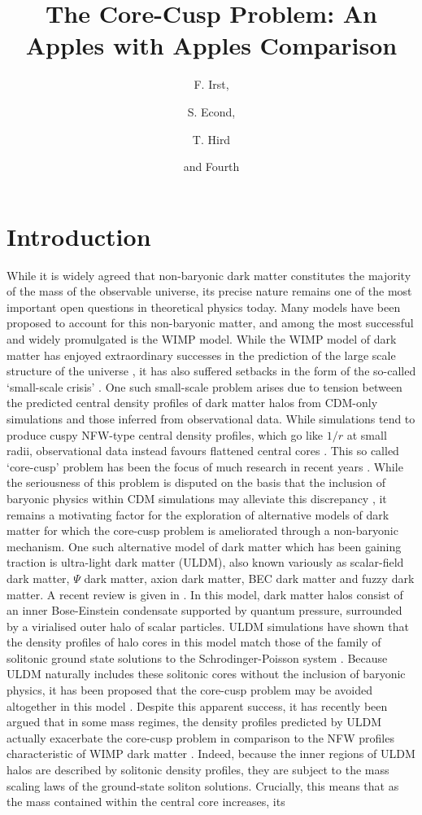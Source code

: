 \documentclass[a4paper,11pt]{article}
\title{\boldmath The Core-Cusp Problem: An Apples with Apples Comparison}
\author[a,b,1]{F. Irst,\note{Corresponding author.}}
\author[c]{S. Econd,}
\author[a,2]{T. Hird\note{Also at Some University.}}
\author[a,2]{and Fourth}
\affiliation[a]{One University,\\some-street, Country}
\affiliation[b]{Another University,\\different-address, Country}
\affiliation[c]{A School for Advanced Studies,\\some-location, Country}
\begin{document}
\maketitle
\flushbottom

\section{Introduction}\label{sec:intro}

While it is widely agreed that non-baryonic dark matter constitutes the majority of the mass of the observable universe, its precise nature remains one of the most important open questions in theoretical physics today. Many models have been proposed to account for this non-baryonic matter, and among the most successful and widely promulgated is the WIMP model. While the WIMP model of dark matter has enjoyed extraordinary successes in the prediction of the large scale structure of the universe \cite{REF}, it has also suffered setbacks in the form of the so-called `small-scale crisis' \cite{https://arxiv.org/abs/1707.04256}. One such small-scale problem arises due to tension between the predicted central density profiles of dark matter halos from CDM-only simulations and those inferred from observational data. While simulations tend to produce cuspy NFW-type central density profiles, which go like $1/r$ at small radii, observational data instead favours flattened central cores \cite{REF} . This so called `core-cusp' problem has been the focus of much research in recent years \cite{Ref}. While the seriousness of this problem is disputed on the basis that the inclusion of baryonic physics within CDM simulations may alleviate this discrepancy \cite{REF}, it remains a motivating factor for the exploration of alternative models of dark matter for which the core-cusp problem is ameliorated through a non-baryonic mechanism. One such alternative model of dark matter which has been gaining traction is ultra-light dark matter (ULDM), also known variously as scalar-field dark matter, $\Psi$ dark matter, axion dark matter, BEC dark matter and fuzzy dark matter. A recent review is given in \cite{Witten review}. In this model, dark matter halos consist of an inner Bose-Einstein condensate supported by quantum pressure, surrounded by a virialised outer halo of scalar particles\cite{Jens, etc. CHECK Virial??}. ULDM simulations have shown that the density profiles of halo cores in this model match those of the family of solitonic ground state solutions to the Schrodinger-Poisson system \cite{Jens, etc}. Because ULDM naturally includes these solitonic cores without the inclusion of baryonic physics, it has been proposed that the core-cusp problem may be avoided altogether in this model \cite{REF}. Despite this apparent success, it has recently been argued that in some mass regimes, the density profiles predicted by ULDM actually exacerbate the core-cusp problem in comparison to the NFW profiles characteristic of WIMP dark matter \cite{Bullock paper}. Indeed, because the inner regions of ULDM halos are described by solitonic density profiles, they are subject to the mass scaling laws of the ground-state soliton solutions. Crucially, this means that as the mass contained within the central core increases, its 
\end{document}
